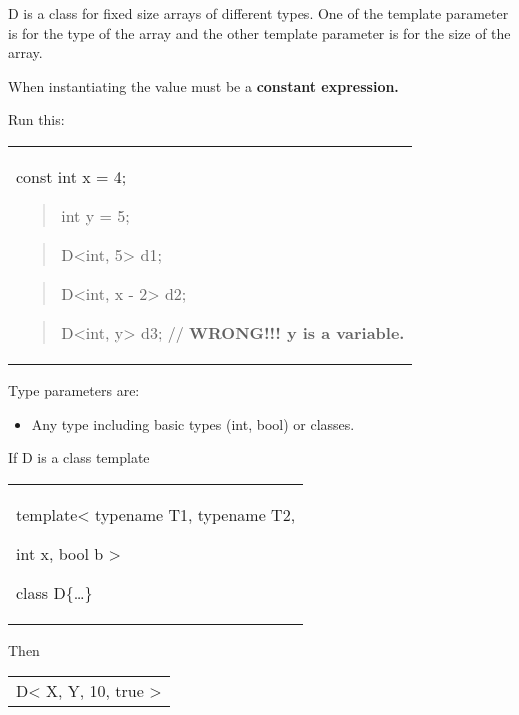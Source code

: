 \documentclass[
]{article}
\providecommand{\tightlist}{%
  \setlength{\itemsep}{0pt}\setlength{\parskip}{0pt}}
\begin{document}
D is a class for fixed size arrays of different types. One of the
template parameter is for the type of the array and the other template
parameter is for the size of the array.

When instantiating the value must be a \textbf{constant expression.}

Run this:

\begin{longtable}[]{@{}
  >{\raggedright\arraybackslash}p{}@{}}
\toprule\noalign{}
 \\
\midrule\noalign{}
\endhead
\bottomrule\noalign{}
\endlastfoot
const int x = 4;

\begin{quote}
int y = 5;
\end{quote}

\begin{quote}
D\textless int, 5\textgreater{} d1;
\end{quote}

\begin{quote}
D\textless int, x - 2\textgreater{} d2;
\end{quote}

\begin{quote}
D\textless int, y\textgreater{} d3; // \textbf{WRONG!!! y is a
variable.}
\end{quote} \\
\end{longtable}

Type parameters are:

\begin{itemize}
\tightlist
\item
  Any type including basic types (int, bool) or classes.
\end{itemize}

If D is a class template

\begin{longtable}[]{@{}
  >{\raggedright\arraybackslash}p{}@{}}
\toprule\noalign{}
 \\
\midrule\noalign{}
\endhead
\bottomrule\noalign{}
\endlastfoot
template\textless{} typename T1, typename T2,

int x, bool b \textgreater{}

class D\{\ldots\} \\
\end{longtable}

Then

\begin{longtable}[]{@{}l@{}}
\toprule\noalign{}
 \\
\midrule\noalign{}
\endhead
\bottomrule\noalign{}
\endlastfoot
D\textless{} X, Y, 10, true \textgreater{} \\
\end{longtable}
\end{document}
